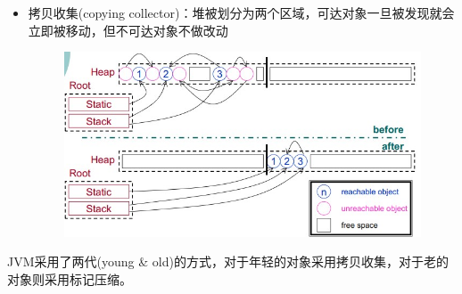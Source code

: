 \begin{itemize}
	\item 拷贝收集(copying collector)：堆被划分为两个区域，可达对象一旦被发现就会立即被移动，但不可达对象不做改动
	\begin{figure}[H]
	\centering
	\includegraphics[width=0.8\linewidth]{fig/copying_collector.jpg}
	\end{figure}
\end{itemize}

JVM采用了两代(young \& old)的方式，对于年轻的对象采用拷贝收集，对于老的对象则采用标记压缩。